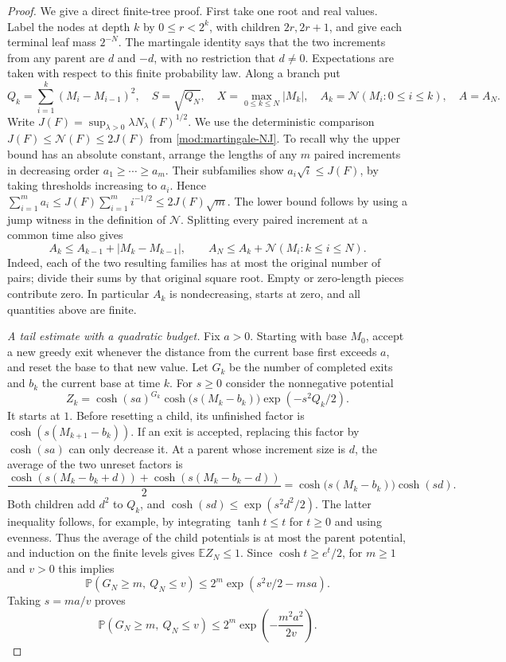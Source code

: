 \documentclass[11pt]{article}
\numberwithin{equation}{section}
\theoremstyle{remark}
\theoremstyle{definition}
\begin{document}
\begin{proof}
We give a direct finite-tree proof. First take one root and real
values. Label the nodes at depth $k$ by $0\le r<2^k$, with children
$2r,2r+1$, and give each terminal leaf mass $2^{-N}$. The martingale
identity says that the two increments from any parent are $d$ and
$-d$, with no restriction that $d\ne0$. Expectations are taken with respect to this finite probability law.
Along a branch put
\[
 Q_k=\sum_{i=1}^k(M_i-M_{i-1})^2,\quad S=\sqrt{Q_N},\quad
 X=\max_{0\le k\le N}|M_k|,\quad
 A_k=\mathcal N(M_i:0\le i\le k),\quad A=A_N.
\]
Write $J(F)=\sup_{\lambda>0}\lambda N_\lambda(F)^{1/2}$.
We use the deterministic comparison
$J(F)\le\mathcal N(F)\le2J(F)$ from
\eqref{mod:martingale-NJ}. To recall why the upper bound has an
absolute constant, arrange the lengths of any $m$ paired increments
in decreasing order $a_1\ge\cdots\ge a_m$. Their subfamilies show
$a_i\sqrt i\le J(F)$, by taking thresholds increasing to $a_i$.
Hence $\sum_{i=1}^m a_i\le J(F)\sum_{i=1}^m i^{-1/2}
\le2J(F)\sqrt m$. The lower bound follows by using a jump witness
in the definition of $\mathcal N$. Splitting every paired increment
at a common time also gives
\[
 A_k\le A_{k-1}+|M_k-M_{k-1}|,\qquad
 A_N\le A_k+\mathcal N(M_i:k\le i\le N).
\]
Indeed, each of the two resulting families has at most the original
number of pairs; divide their sums by that original square root.
Empty or zero-length pieces contribute zero. In particular $A_k$
is nondecreasing, starts at zero, and all quantities above are finite.

\emph{A tail estimate with a quadratic budget.}
Fix $a>0$. Starting with base $M_0$, accept a new greedy exit
whenever the distance from the current base first exceeds $a$,
and reset the base to that new value. Let $G_k$ be the number of
completed exits and $b_k$ the current base at time $k$.
For $s\ge0$ consider the nonnegative potential
\[
 Z_k=\cosh(sa)^{G_k}\cosh\bigl(s(M_k-b_k)\bigr)
             \exp(-s^2Q_k/2).
\]
It starts at $1$. Before resetting a child, its unfinished factor is
$\cosh(s(M_{k+1}-b_k))$. If an exit is accepted, replacing this
factor by $\cosh(sa)$ can only decrease it. At a parent whose
increment size is $d$, the average of the two unreset factors is
\[
 \frac{\cosh(s(M_k-b_k+d))+\cosh(s(M_k-b_k-d))}{2}
 =\cosh\bigl(s(M_k-b_k)\bigr)\cosh(sd).
\]
Both children add $d^2$ to $Q_k$, and
$\cosh(sd)\le\exp(s^2d^2/2)$. The latter inequality follows, for
example, by integrating $\tanh t\le t$ for $t\ge0$ and using
evenness. Thus the average of the child potentials is at most the
parent potential, and induction on the finite levels gives
$\mathbb E Z_N\le1$. Since $\cosh t\ge e^t/2$, for $m\ge1$ and
$v>0$ this implies
\[
 \mathbb P(G_N\ge m,\ Q_N\le v)
 \le2^m\exp(s^2v/2-msa).
\]
Taking $s=ma/v$ proves
\[
 \mathbb P(G_N\ge m,\ Q_N\le v)
 \le2^m\exp\left(-\frac{m^2a^2}{2v}\right).
\]


\end{proof}
\end{document}
